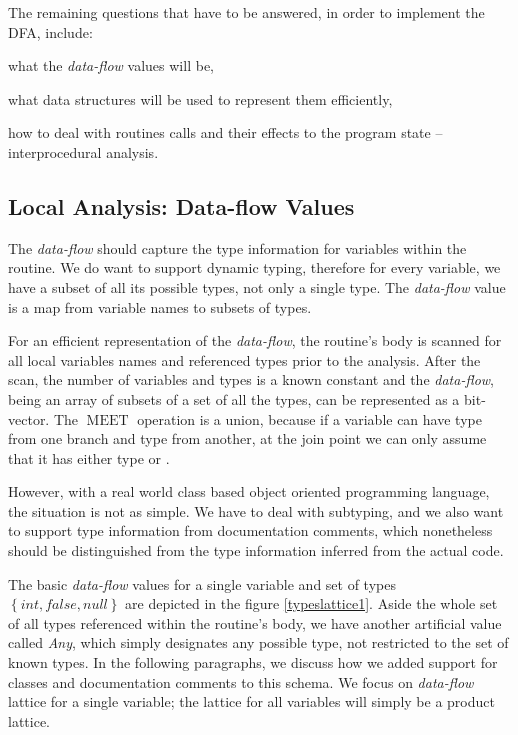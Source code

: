         The remaining questions that have to be answered, in order to 
        implement the DFA, include:
        
        \begin{itemize*}
            \item what the \emph{data-flow} values will be, 
            \item what data structures will be used to represent them efficiently, 
            \item how to deal with routines calls and their 
                effects to the program state -- interprocedural analysis.
        \end{itemize*}
        
        \subsection{Local Analysis: Data-flow Values}
        
        The \emph{data-flow} should capture the type information 
        for variables within the routine. We do want to support 
        dynamic typing, therefore for every variable, we have 
        a subset of all its possible types, not only a single type.        
        The \emph{data-flow} value is a map from variable names to 
        subsets of types. 
        
        For an efficient representation of the \emph{data-flow}, 
        the routine's body is scanned for all local variables names 
        and referenced types prior to the analysis. After the scan, the 
        number of variables and types is a known constant and the 
        \emph{data-flow}, being an array of subsets of a set 
        of all the types, can be represented as a bit-vector. 
        The $\operatorname{MEET}$ operation is a union, because if 
        a variable can have type  from one branch and 
        type  from another, at the join point we can only 
        assume that it has either type  or .
        
        However, with a real world class based object oriented 
        programming language, the situation is not as simple. 
        We have to deal with subtyping, and we also want to 
        support type information from documentation comments, 
        which nonetheless should be distinguished from the 
        type information inferred from the actual code.
        
        The basic \emph{data-flow} values for a single variable 
        and set of types $\left\{int, false, null\right\}$ are depicted 
        in the figure \ref{typeslattice1}. Aside the whole set of 
        all types referenced within the routine's body, we have 
        another artificial value called \emph{Any}, which simply 
        designates any possible type, not restricted to the set 
        of known types. In the following paragraphs, we discuss 
        how we added support for classes and documentation 
        comments to this schema. We focus on \emph{data-flow} 
        lattice for a single variable; the lattice for all variables 
        will simply be a product lattice.
        
